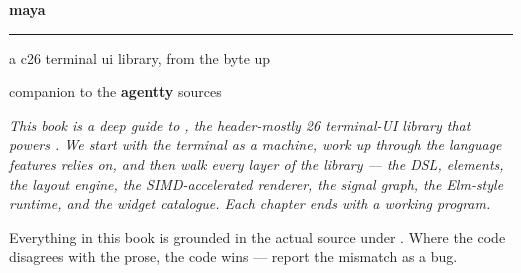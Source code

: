 \documentclass[11pt,openany,oneside]{book}
\date{}
\begin{document}
\frontmatter

\begin{titlepage}
\thispagestyle{empty}

\vspace*{\fill}

\begin{center}
  {\fontsize{96}{100}\selectfont\sffamily\bfseries\color{mayablue} maya}
\end{center}

\vspace{0.6cm}

\begin{center}
  {\color{mayablue}\rule{4cm}{0.6pt}}
\end{center}

\vspace{0.6cm}

\begin{center}
  {\fontsize{12}{16}\selectfont\sffamily\color{mayagrey}
    a c\nolinebreak\hspace{-.05em}\raisebox{.2ex}{\small{++}}26 terminal ui library, from the byte up\par}
\end{center}

\vspace*{\fill}

\begin{center}
  {\fontsize{9}{12}\selectfont\sffamily\color{mayagrey}
    companion to the \textbf{agentty} sources\par}
\end{center}

\vspace*{1.5cm}
\end{titlepage}

\thispagestyle{empty}
\vspace*{\fill}
\begin{center}
\begin{minipage}{0.78\textwidth}
\small\itshape
This book is a deep guide to \maya{}, the header-mostly \cpp{}26
terminal-UI library that powers \agentty. We start with the terminal
as a machine, work up through the \cpp{} language features \maya{}
relies on, and then walk every layer of the library --- the DSL,
elements, the layout engine, the SIMD-accelerated renderer, the
signal graph, the Elm-style runtime, and the widget catalogue. Each
chapter ends with a working program.

\medskip

Everything in this book is grounded in the actual source under
. Where the code disagrees with the prose, the code wins
--- report the mismatch as a bug.
\end{minipage}
\end{center}
\vspace*{\fill}
\clearpage
\end{document}
